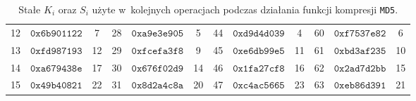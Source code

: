 \documentclass[12pt,a4paper,twoside]{article}
\begin{document}
\begin{table}[htb]
{\begin{tabular}{ |c|c|c|| c|c|c|| c|c|c|| c|c|c| }
        12 & $\mathtt{0x6b901122}$ & 7 & 28 & $\mathtt{0xa9e3e905}$ & 5 & 44 & $\mathtt{0xd9d4d039}$ & 4 & 60 & $\mathtt{0xf7537e82}$ & 6 \\
        13 & $\mathtt{0xfd987193}$ & 12 & 29 & $\mathtt{0xfcefa3f8}$ & 9 & 45 & $\mathtt{0xe6db99e5}$ & 11 & 61 & $\mathtt{0xbd3af235}$ & 10 \\
        14 & $\mathtt{0xa679438e}$ & 17 & 30 & $\mathtt{0x676f02d9}$ & 14 & 46 & $\mathtt{0x1fa27cf8}$ & 16 & 62 & $\mathtt{0x2ad7d2bb}$ & 15 \\
        15 & $\mathtt{0x49b40821}$ & 22 & 31 & $\mathtt{0x8d2a4c8a}$ & 20 & 47 & $\mathtt{0xc4ac5665}$ & 23 & 63 & $\mathtt{0xeb86d391}$ & 21 \\
        \hline
    \end{tabular}
    }
    \caption{Stałe $K_i$ oraz $S_i$ użyte w~kolejnych operacjach
    podczas działania funkcji kompresji \texttt{MD5}.}
    \label{tbl:md5_operation_const}
\end{table}
\end{document}

